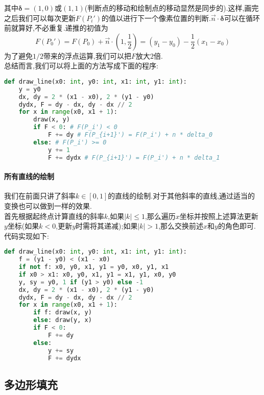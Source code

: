 \documentclass{ctexart}
\begin{document}
其中$\boldsymbol{\delta}=(1,0)$或$(1,1)$(判断点的移动和绘制点的移动显然是同步的).这样,画完之后我们可以每次更新$F\left(P_i'\right)$的值以进行下一个像素位置的判断.$\vec{n}\cdot\boldsymbol{\delta}$可以在循环前就算好,不必重复.递推的初值为
\[F\left(P_0'\right)=F\left(P_0\right)+\vec{n}\cdot\left(1,\dfrac12\right)=\left(y_1-y_0\right)-\dfrac12\left(x_1-x_0\right)\]
为了避免$1/2$带来的浮点运算,我们可以把$F$放大$2$倍.\\
\indent 总结而言,我们可以将上面的方法写成下面的程序:
\begin{lstlisting}[language=Python]
def draw_line(x0: int, y0: int, x1: int, y1: int):
    y = y0
    dx, dy = 2 * (x1 - x0), 2 * (y1 - y0)
    dydx, F = dy - dx, dy - dx // 2
    for x in range(x0, x1 + 1):
        draw(x, y)
        if F < 0: # F(P_i') < 0
            F += dy # F(P_{i+1}') = F(P_i') + n * delta_0
        else: # F(P_i') >= 0
            y += 1
            F += dydx # F(P_{i+1}') = F(P_i') + n * delta_1
\end{lstlisting}
\paragraph{所有直线的绘制}
我们在前面只讲了斜率$k\in[0,1]$的直线的绘制.对于其他斜率的直线,通过适当的变换也可以做到一样的效果.\\
\indent 首先根据起终点计算直线的斜率$k$,如果$|k|\leqslant 1$,那么遍历$x$坐标并按照上述算法更新$y$坐标(如果$k<0$,更新$y$时需将其递减);如果$|k|>1$,那么交换前述$x$和$y$的角色即可.代码实现如下:
\begin{lstlisting}[language=Python]
def draw_line(x0: int, y0: int, x1: int, y1: int):
    f = (y1 - y0) < (x1 - x0)
    if not f: x0, y0, x1, y1 = y0, x0, y1, x1
    if x0 > x1: x0, y0, x1, y1 = x1, y1, x0, y0
    y, sy = y0, 1 if (y1 > y0) else -1
    dx, dy = 2 * (x1 - x0), 2 * (y1 - y0)
    dydx, F = dy - dx, dy - dx // 2
    for x in range(x0, x1 + 1):
        if f: draw(x, y)
        else: draw(y, x)
        if F < 0:
            F += dy
        else: 
            y += sy
            F += dydx
\end{lstlisting}
\subsection{多边形填充}
\end{document}
